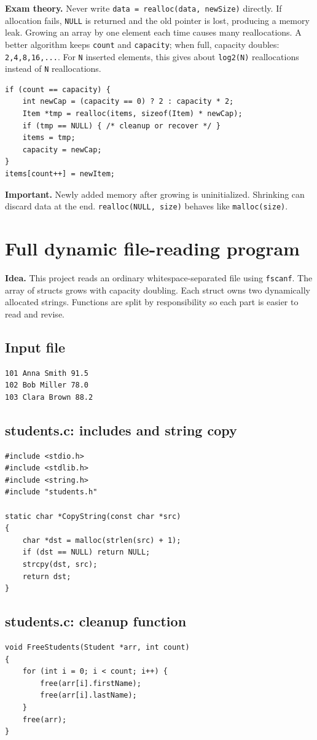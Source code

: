 \documentclass[10pt,a4paper]{article}
\newcommand{\idea}{\noindent\textbf{\textcolor{accentdark}{Idea.}} }
\newcommand{\theory}{\noindent\textbf{\textcolor{accentdark}{Exam theory.}} }
\newcommand{\codepart}[1]{\Needspace{6\baselineskip}\subsection*{#1}}
\newcommand{\important}[1]{\par\smallskip\noindent\colorbox{softyellow}{\parbox{\dimexpr\linewidth-2\fboxsep}{\textbf{\textcolor{accentdark}{Important.}} #1}}\par\smallskip}
\begin{document}
\theory Never write \texttt{data = realloc(data, newSize)} directly. If allocation fails, \texttt{NULL} is returned and the old pointer is lost, producing a memory leak. Growing an array by one element each time causes many reallocations. A better algorithm keeps \texttt{count} and \texttt{capacity}; when full, capacity doubles: \texttt{2,4,8,16,...}. For \texttt{N} inserted elements, this gives about \texttt{log2(N)} reallocations instead of \texttt{N} reallocations.

\begin{lstlisting}[caption={Capacity-doubling insertion idea}]
if (count == capacity) {
    int newCap = (capacity == 0) ? 2 : capacity * 2;
    Item *tmp = realloc(items, sizeof(Item) * newCap);
    if (tmp == NULL) { /* cleanup or recover */ }
    items = tmp;
    capacity = newCap;
}
items[count++] = newItem;
\end{lstlisting}

\important{Newly added memory after growing is uninitialized. Shrinking can discard data at the end. \texttt{realloc(NULL, size)} behaves like \texttt{malloc(size)}.}

\section{Full dynamic file-reading program}
\idea This project reads an ordinary whitespace-separated file using \texttt{fscanf}. The array of structs grows with capacity doubling. Each struct owns two dynamically allocated strings. Functions are split by responsibility so each part is easier to read and revise.

\codepart{Input file}
\begin{lstlisting}[caption={data.txt}]
101 Anna Smith 91.5
102 Bob Miller 78.0
103 Clara Brown 88.2
\end{lstlisting}

\codepart{students.c: includes and string copy}
\begin{lstlisting}[caption={students.c, part 1}]
#include <stdio.h>
#include <stdlib.h>
#include <string.h>
#include "students.h"

static char *CopyString(const char *src)
{
    char *dst = malloc(strlen(src) + 1);
    if (dst == NULL) return NULL;
    strcpy(dst, src);
    return dst;
}
\end{lstlisting}

\codepart{students.c: cleanup function}
\begin{lstlisting}[caption={students.c, part 2}]
void FreeStudents(Student *arr, int count)
{
    for (int i = 0; i < count; i++) {
        free(arr[i].firstName);
        free(arr[i].lastName);
    }
    free(arr);
}
\end{lstlisting}
\end{document}
